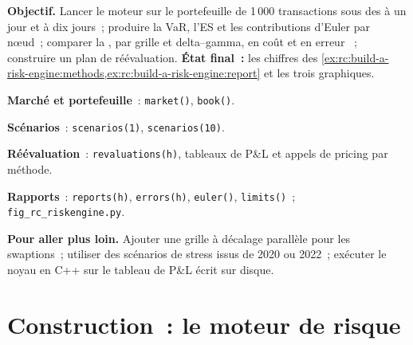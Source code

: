 \begin{tutorial}
\textbf{Objectif.} Lancer le moteur sur le portefeuille de 1\,000 transactions sous des  à un jour et à dix jours~;
produire la VaR, l'ES et les contributions d'Euler par nœud~; comparer la , par grille et delta--gamma, en coût et en erreur
~; construire un plan de réévaluation. \textbf{État final~:} les chiffres des
\cref{ex:rc:build-a-risk-engine:methods,ex:rc:build-a-risk-engine:report} et les trois graphiques.
\begin{tutsteps}
\item \textbf{Marché et portefeuille}~: \texttt{market()}, \texttt{book()}.
\item \textbf{Scénarios}~: \texttt{scenarios(1)}, \texttt{scenarios(10)}.
\item \textbf{Réévaluation}~: \texttt{revaluations(h)}, tableaux de P\&L et appels de pricing par méthode.
\item \textbf{Rapports}~: \texttt{reports(h)}, \texttt{errors(h)}, \texttt{euler()}, \texttt{limits()}~;
\texttt{fig\_rc\_riskengine.py}.
\end{tutsteps}
\textbf{Pour aller plus loin.} Ajouter une grille à décalage parallèle pour les swaptions~; utiliser des scénarios de stress issus de
2020 ou 2022~; exécuter le noyau en C++ sur le tableau de P\&L écrit sur disque.
\end{tutorial}

\section{Construction~: le moteur de risque}\label{bld:rc:build-a-risk-engine:riskengine}

